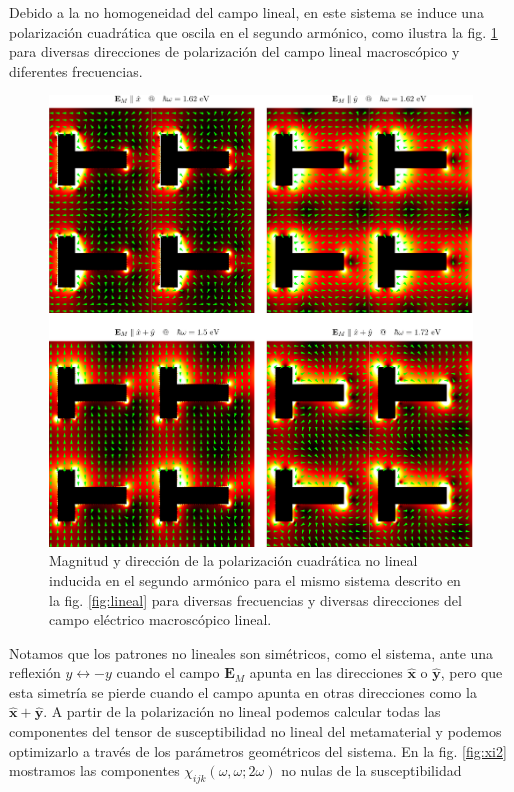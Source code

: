 \documentclass[12pt]{article}
\begin{document}
Debido a la no homogeneidad del campo lineal, en este sistema se
induce una polarización cuadrática que oscila en el segundo armónico,
como ilustra la fig. \ref{fig:P2} para diversas direcciones de
polarización del campo lineal macroscópico y diferentes frecuencias.
\begin{figure}
  \centering
  \includegraphics[width=\textwidth]{fig19}
  \caption{Magnitud y dirección de la polarización cuadrática no
    lineal inducida en el segundo armónico para el mismo sistema
    descrito en la fig. \ref{fig:lineal} para diversas frecuencias y
    diversas direcciones del campo eléctrico macroscópico lineal.}
  \label{fig:P2}
\end{figure}
Notamos que los patrones no lineales son simétricos, como el sistema,
ante una reflexión $y\leftrightarrow -y$ cuando el campo $\bm E_M$
apunta en las direcciones $\hat{\bm x}$ o $\hat{\bm y}$, pero que esta simetría se pierde
cuando el campo apunta en otras direcciones como la $\hat{\bm
  x}+\hat{\bm y}$.
A partir de la polarización no lineal podemos calcular todas las
componentes del tensor de susceptibilidad no lineal del metamaterial y
podemos optimizarlo a través de los parámetros geométricos del
sistema. En la fig. \ref{fig:xi2} mostramos las componentes
$\chi_{ijk}(\omega,\omega;2\omega)$ no nulas de la susceptibilidad
\end{document}
